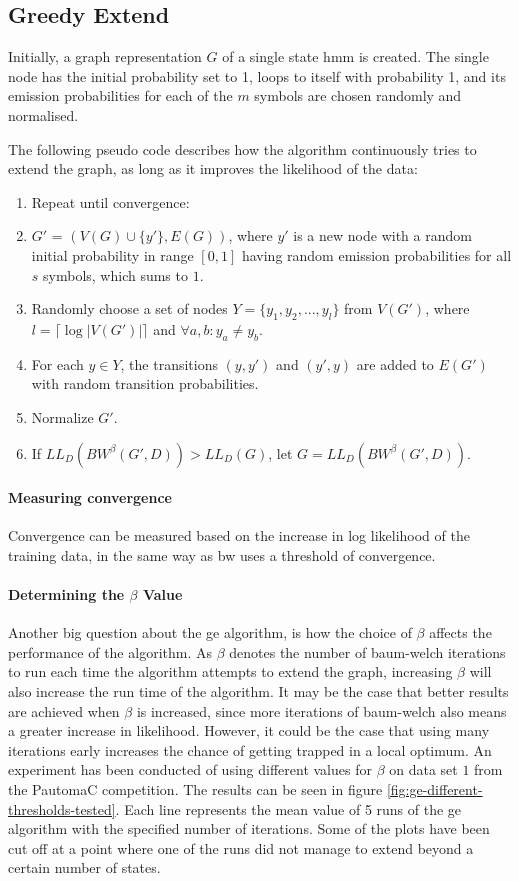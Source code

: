 \subsection{Greedy Extend}
\label{sec:greedy_extend}
Initially, a graph representation $G$ of a single state \gls{hmm} is created. The single node has the initial probability set to 1, loops to itself with probability 1, and its emission probabilities for each of the $m$ symbols are chosen randomly and normalised.

The following pseudo code describes how the algorithm continuously tries to extend the graph, as long as it improves the likelihood of the data:
\begin{enumerate}
\item Repeat until convergence:
	\item $G'$ = $(V(G) \cup \{y'\}, E(G))$, where $y'$ is a new node with a random initial probability in range $[0, 1]$ having random emission probabilities for all $s$ symbols, which sums to $1$.
	\item Randomly choose a set of nodes $Y = \{y_1, y_2, ... , y_l\}$ from $V(G')$, where $l = \lceil \log |V(G')| \rceil$ and $\forall a,b: y_a \neq y_b$.
	\item For each $y \in Y$, the transitions $(y, y')$ and $(y', y)$ are added to $E(G')$ with random transition probabilities.
	\item Normalize $G'$.
	\item If $LL_D(BW^{\beta}(G', D)) > LL_D(G)$, let $G = LL_D(BW^{\beta}(G', D))$.
\end{enumerate}

\paragraph{Measuring convergence}
Convergence can be measured based on the increase in log likelihood of the training data, in the same way as \gls{bw} uses a threshold of convergence.

\paragraph{Determining the $\beta$ Value}
Another big question about the \gls{ge} algorithm, is how the choice of $\beta$ affects the performance of the algorithm.
As $\beta$ denotes the number of \gls{baum-welch} iterations to run each time the algorithm attempts to extend the graph, increasing $\beta$ will also increase the run time of the algorithm. It may be the case that better results are achieved when $\beta$ is increased, since more iterations of \gls{baum-welch} also means a greater increase in likelihood. However, it could be the case that using many iterations early increases the chance of getting trapped in a local optimum.
An experiment has been conducted of using different values for $\beta$ on data set $1$ from the PautomaC competition. The results can be seen in figure \ref{fig:ge-different-thresholds-tested}. Each line represents the mean value of 5 runs of the \gls{ge} algorithm with the specified number of iterations. Some of the plots have been cut off at a point where one of the runs did not manage to extend beyond a certain number of states.

